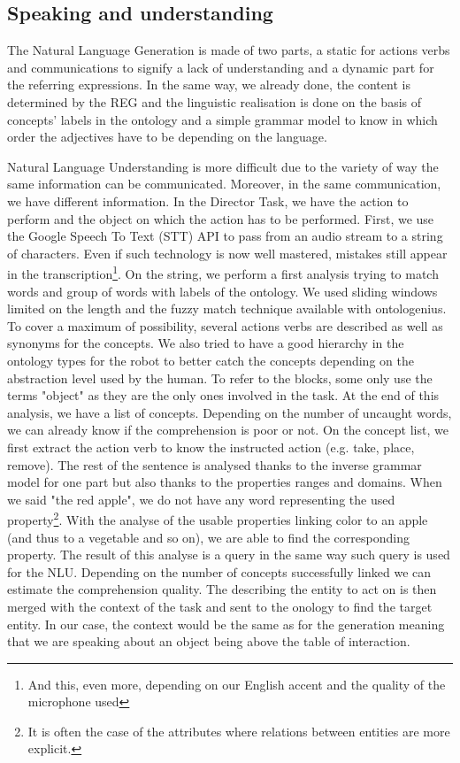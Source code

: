 \subsection{Speaking and understanding}

The Natural Language Generation is made of two parts, a static for actions verbs and communications to signify a lack of understanding and a dynamic part for the referring expressions. In the same way, we already done, the content is determined by the REG and the linguistic realisation is done on the basis of concepts' labels in the ontology and a simple grammar model to know in which order the adjectives have to be depending on the language.

Natural Language Understanding is more difficult due to the variety of way the same information can be communicated. Moreover, in the same communication, we have different information. In the Director Task, we have the action to perform and the object on which the action has to be performed. First, we use the Google Speech To Text (STT) API to pass from an audio stream to a string of characters. Even if such technology is now well mastered, mistakes still appear in the transcription\footnote{And this, even more, depending on our English accent and the quality of the microphone used}. On the string, we perform a first analysis trying to match words and group of words with labels of the ontology. We used sliding windows limited on the length and the fuzzy match technique available with ontologenius. To cover a maximum of possibility, several actions verbs are described as well as synonyms for the concepts. We also tried to have a good hierarchy in the ontology types for the robot to better catch the concepts depending on the abstraction level used by the human. To refer to the blocks, some only use the terms "object" as they are the only ones involved in the task. At the end of this analysis, we have a list of concepts. Depending on the number of uncaught words, we can already know if the comprehension is poor or not. On the concept list, we first extract the action verb to know the instructed action (e.g. take, place, remove). The rest of the sentence is analysed thanks to the inverse grammar model for one part but also thanks to the properties ranges and domains. When we said "the red apple", we do not have any word representing the used property\footnote{It is often the case of the attributes where relations between entities are more explicit.}. With the analyse of the usable properties linking color to an apple (and thus to a vegetable and so on), we are able to find the corresponding property. The result of this analyse is a \sparql{} query in the same way such query is used for the NLU. Depending on the number of concepts successfully linked we can estimate the comprehension quality. The \sparql{} describing the entity to act on is then merged with the context of the task and sent to the onology to find the target entity. In our case, the context would be the same as for the generation meaning that we are speaking about an object being above the table of interaction.

